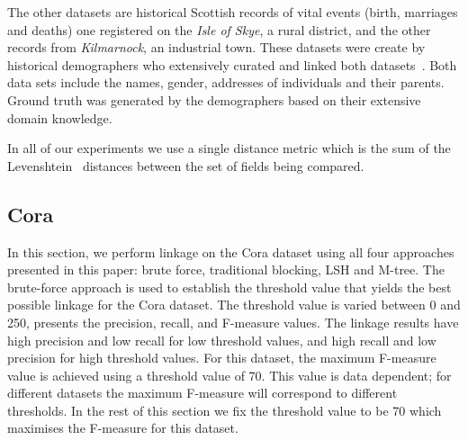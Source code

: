 \documentclass{llncs}
\begin{document}
The other datasets are historical Scottish records of vital events
(birth, marriages and deaths) one registered on the \emph{Isle of Skye},
a rural district, and the other records from \emph{Kilmarnock}, an
industrial town. These datasets were create by historical demographers
who extensively curated and linked both
datasets~\cite{reid2002,reid2006}. Both data sets include the names,
gender, addresses of individuals and their parents. Ground truth was
generated by the demographers based on their extensive domain knowledge.

In all of our experiments we use a single distance metric which is the
sum of the Levenshtein~\cite{Levenshtein66} distances between the set of
fields being compared.

\subsection{Cora}

In this section, we perform linkage on the Cora dataset using all four
approaches presented in this paper: brute force, traditional blocking,
LSH and M-tree. The brute-force approach is used to establish the
threshold value that yields the best possible linkage for the Cora
dataset. The threshold value is varied between 0 and 250,
 presents the precision, recall, and F-measure
values. The linkage results have high precision and low recall for low
threshold values, and high recall and low precision for high threshold
values. For this dataset, the maximum F-measure value is achieved using
a threshold value of 70. This value is data dependent; for different
datasets the maximum F-measure will correspond to different thresholds.
In the rest of this section we fix the threshold value to be 70 which
maximises the F-measure for this dataset.
\end{document}
